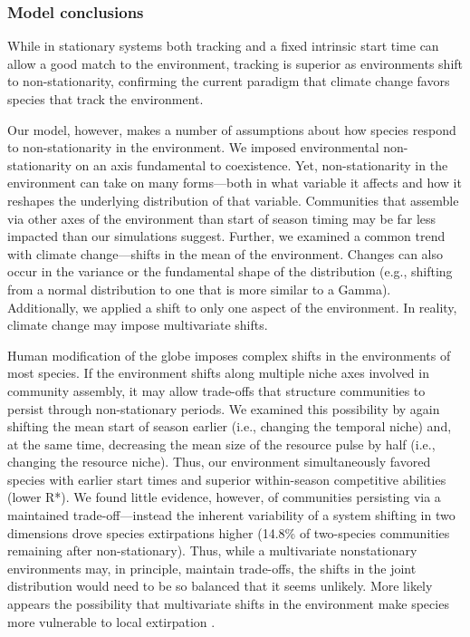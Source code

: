 \documentclass[11pt,letterpaper]{article}
\begin{document}
\subsubsection{Model conclusions}

While in stationary systems both tracking and a fixed intrinsic start time can allow a good match to the environment, tracking is superior as environments shift to non-stationarity, confirming the current paradigm that climate change favors species that track the environment. 

Our model, however, makes a number of assumptions about how species respond to non-stationarity in the environment. We imposed environmental non-stationarity on an axis fundamental to coexistence. Yet, non-stationarity in the environment can take on many forms---both in what variable it affects and how it reshapes the underlying distribution of that variable. Communities that assemble via other axes of the environment than start of season timing may be far less impacted than our simulations suggest. Further, we examined a common trend with climate change---shifts in the mean of the environment. Changes can also occur in the variance or the fundamental shape of the distribution (e.g., shifting from a normal distribution to one that is more similar to a Gamma). Additionally, we applied a shift to only one aspect of the environment. In reality, climate change may impose multivariate shifts.

Human modification of the globe imposes complex shifts in the environments of most species. If the environment shifts along multiple niche axes involved in community assembly, it may allow trade-offs that structure communities to persist through non-stationary periods. We examined this possibility by again shifting the mean start of season earlier (i.e., changing the temporal niche) and, at the same time, decreasing the mean size of the resource pulse by half (i.e., changing the resource niche). Thus, our environment simultaneously favored species with earlier start times and superior within-season competitive abilities (lower R*). We found little evidence, however, of communities persisting via a maintained trade-off---instead the inherent variability of a system shifting in two dimensions drove species extirpations higher (14.8\% of two-species communities remaining after non-stationary). Thus, while a multivariate nonstationary environments may, in principle, maintain trade-offs, the shifts in the joint distribution would need to be so balanced that it seems unlikely. More likely appears the possibility that multivariate shifts in the environment make species more vulnerable to local extirpation \citep{sixthectinction2011,IPCC:2014sm}.
\end{document}
